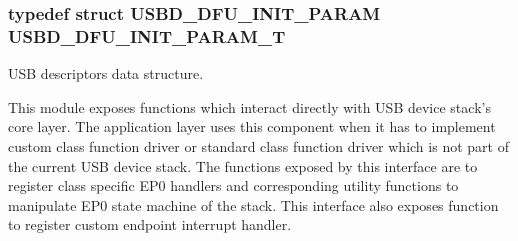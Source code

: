 \hypertarget{group__USBD__DFU_ga8506b43ae2bda83cc8c459114fd3fc82}{
\subsubsection[{U\-S\-B\-D\-\_\-\-D\-F\-U\-\_\-\-I\-N\-I\-T\-\_\-\-P\-A\-R\-A\-M\-\_\-\-T}]{\setlength{\rightskip}{0pt plus 5cm}typedef struct {\bf U\-S\-B\-D\-\_\-\-D\-F\-U\-\_\-\-I\-N\-I\-T\-\_\-\-P\-A\-R\-A\-M}  {\bf U\-S\-B\-D\-\_\-\-D\-F\-U\-\_\-\-I\-N\-I\-T\-\_\-\-P\-A\-R\-A\-M\-\_\-\-T}}}\label{group__USBD__DFU_ga8506b43ae2bda83cc8c459114fd3fc82}


U\-S\-B descriptors data structure. 

This module exposes functions which interact directly with U\-S\-B device stack's core layer. The application layer uses this component when it has to implement custom class function driver or standard class function driver which is not part of the current U\-S\-B device stack. The functions exposed by this interface are to register class specific E\-P0 handlers and corresponding utility functions to manipulate E\-P0 state machine of the stack. This interface also exposes function to register custom endpoint interrupt handler. 